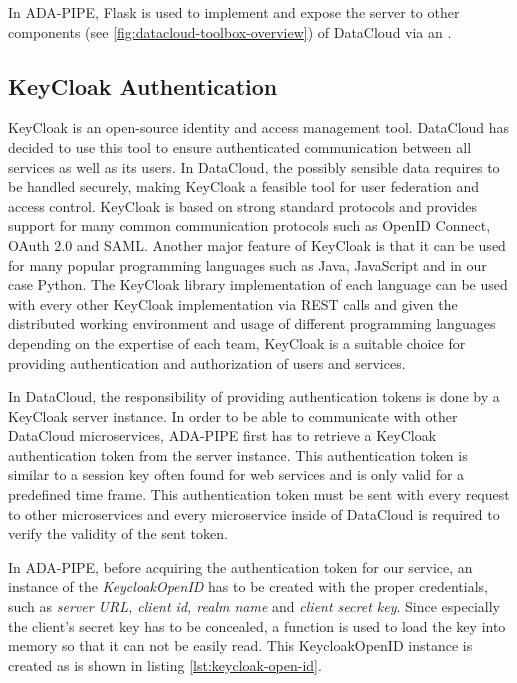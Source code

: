 \documentclass{article}
\begin{document}
            In ADA-PIPE, Flask is used to implement and expose the  server to other components (see \ref{fig:datacloud-toolbox-overview}) of DataCloud via an .

        \subsection{KeyCloak Authentication}
        \label{sec:keycloak-server}

            KeyCloak \cite{keycloakDocumentationKeycloak} is an open-source identity and access management tool.
            DataCloud has decided to use this tool to ensure authenticated communication between all services as well as its users.
            In DataCloud, the possibly sensible data requires to be handled securely, making KeyCloak a feasible tool for user federation and access control. KeyCloak is based on strong standard protocols and provides support for many common communication protocols such as OpenID Connect, OAuth 2.0 and SAML.
            Another major feature of KeyCloak is that it can be used for many popular programming languages such as Java, JavaScript and in our case Python. The KeyCloak library implementation of each language can be used with every other KeyCloak implementation via REST calls and given the distributed working environment and usage of different programming languages depending on the expertise of each team, KeyCloak is a suitable choice for providing authentication and authorization of users and services.

            In DataCloud, the responsibility of providing authentication tokens is done by a KeyCloak server instance.
            In order to be able to communicate with other DataCloud microservices, ADA-PIPE first has to retrieve a KeyCloak authentication token from the server instance. This authentication token is similar to a session key often found for web services and is only valid for a predefined time frame. This authentication token must be sent with every request to other microservices and every microservice inside of DataCloud is required to verify the validity of the sent token.

            In ADA-PIPE, before acquiring the authentication token for our service, an instance of the \emph{KeycloakOpenID} has to be created with the proper credentials, such as \emph{server URL, client id, realm name} and \emph{client secret key}. Since especially the client's secret key has to be concealed, a function is used to load the key into memory so that it can not be easily read. This KeycloakOpenID instance is created as is shown in listing \ref{lst:keycloak-open-id}.
            
\end{document}
